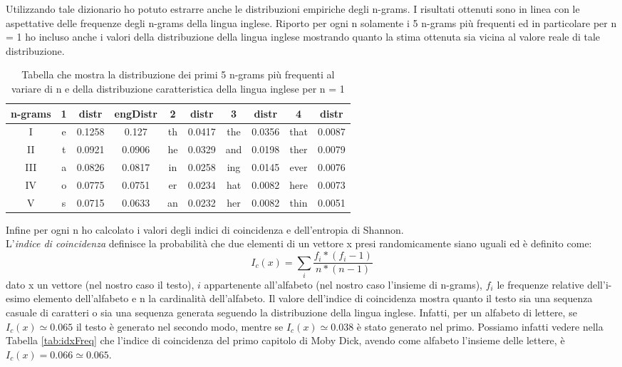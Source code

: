 \documentclass{article}
\begin{document}
Utilizzando tale dizionario ho potuto estrarre anche le distribuzioni empiriche degli n-grams. I risultati ottenuti sono in linea con le aspettative delle frequenze degli n-grams della lingua inglese. Riporto per ogni n solamente i 5 n-grams più frequenti ed in particolare per n = 1 ho incluso anche i valori della distribuzione della lingua inglese mostrando quanto la stima ottenuta sia vicina al valore reale di tale distribuzione.
\begin{table}[]
    \centering
        \begin{tabular}{ c || c | c | c || c | c || c | c || c | c |}
         n-grams&1&distr&engDistr&2&distr&3&distr&4&distr\\\hline
         I&e&0.1258&0.127&th&0.0417&the&0.0356&that&0.0087 \\ 
         II&t&0.0921&0.0906&he&0.0329&and&0.0198&ther&0.0079\\  
         III&a&0.0826&0.0817&in&0.0258&ing&0.0145&ever&0.0076\\
         IV&o&0.0775&0.0751&er&0.0234&hat&0.0082&here&0.0073\\
         V&s&0.0715&0.0633&an&0.0232&her&0.0082&thin&0.0051
        \end{tabular}
    \caption{Tabella che mostra la distribuzione dei primi 5 n-grams più frequenti al variare di n e della distribuzione caratteristica della lingua inglese per n = 1}
    \label{tab:freq}
\end{table}
Infine per ogni n ho calcolato i valori degli indici di coincidenza e dell'entropia di Shannon. \\
L'\textit{indice di coincidenza} definisce la probabilità che due elementi di un vettore x presi randomicamente siano uguali ed è definito come: 
\begin{equation}
I_c(x) = \sum_{i} \dfrac{f_i*(f_i - 1)}{n*(n-1)}
\end{equation}
dato x un vettore (nel nostro caso il testo), $i$ appartenente all'alfabeto (nel nostro caso l'insieme di n-grams), $f_i$ le frequenze relative dell'i-esimo elemento dell'alfabeto e n la cardinalità dell'alfabeto. Il valore dell'indice di coincidenza mostra quanto il testo sia una sequenza casuale di caratteri o sia una sequenza generata seguendo la distribuzione della lingua inglese. Infatti, per un alfabeto di lettere, se $I_c(x) \simeq 0.065$ il testo è generato nel secondo modo, mentre se $I_c(x) \simeq 0.038$ è stato generato nel primo. Possiamo infatti vedere nella Tabella \ref{tab:idxFreq} che l'indice di coincidenza del primo capitolo di Moby Dick, avendo come alfabeto l'insieme delle lettere, è $I_c(x) = 0.066  \simeq 0.065$.\\\\
\end{document}

